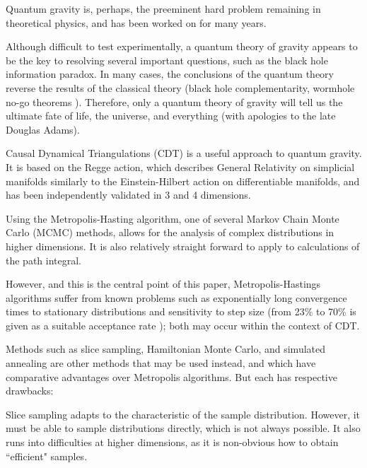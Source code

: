 \documentclass[12pt]{article}
\begin{document}
Quantum gravity is, perhaps, the preeminent hard problem\cite{steve_carlip_why_2014} remaining in theoretical physics, and has been worked on for many years\cite{rovelli_notes_2000}.

Although difficult to test experimentally, a quantum theory of gravity appears to be the key to resolving several important
questions, such as the black hole information paradox.\cite{preskill_black_1992} In many cases, the conclusions of the quantum theory reverse the results of the classical theory
(black hole complementarity\cite{almheiri_black_2013}, wormhole no-go theorems \cite{visser_lorentzian_1996}). Therefore, only a quantum theory of gravity will tell us the ultimate
fate of life, the universe, and everything (with apologies to the late Douglas Adams).\cite{adams_life_1997}

Causal Dynamical Triangulations (CDT) \cite{ambjorn_non-perturbative_2000,j._ambjorn_dynamically_2001,loll_discrete_2003,ambjorn_quantum_2013,cooperman_making_2014} is a useful
approach to quantum gravity. It is based on the Regge action\cite{regge_general_1961}, which describes General Relativity on simplicial manifolds similarly to the Einstein-Hilbert
action on differentiable manifolds, and has been independently validated in 3 and 4 dimensions.\cite{kommu_validation_2011}

Using the Metropolis-Hasting algorithm\cite{robert_metropolis-hastings_2015}, one of several Markov Chain Monte Carlo (MCMC) methods, allows
for the analysis of complex distributions in higher dimensions.\cite{grisins_metropolishastings_2014} It is also relatively straight forward to apply to calculations
of the path integral.

However, and this is the central point of this paper, Metropolis-Hastings algorithms suffer from known problems such as exponentially long convergence times to stationary
distributions and sensitivity to step size (from 23\% to 70\% is given as a suitable acceptance rate \cite{bedard_optimal_2008,xing_markov_nodate}); both may occur within the context
of CDT.

Methods such as slice sampling, Hamiltonian Monte Carlo, and simulated annealing are other methods that may be used instead, and which have comparative advantages over Metropolis
algorithms. But each has respective drawbacks:

Slice sampling \cite{neal_slice_2003} adapts to the characteristic of the sample distribution. However, it must be able to sample distributions directly, which is not always possible.
It also runs into difficulties at higher dimensions, as it is non-obvious how to obtain ``efficient" samples.
\end{document}
